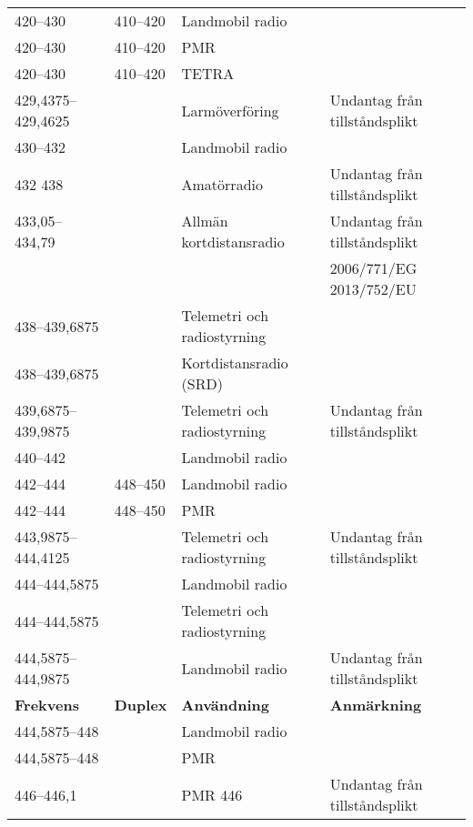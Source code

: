 \documentclass[10pt,swedish,a4paper,twoside]{article}
\begin{document}
\begin{landscape}
\begin{longtable}{llll}
	420--430           & 410--420           & Landmobil radio                &  \\
	420--430           & 410--420           & PMR                            &  \\
	420--430           & 410--420           & TETRA                          &  \\
	429,4375--429,4625 &                    & Larmöverföring                 & Undantag från tillståndsplikt       \\
	430--432           &                    & Landmobil radio                &  \\
	432	438            &                    & Amatörradio                    & Undantag från tillståndsplikt       \\
	433,05--434,79     &                    & Allmän kortdistansradio        & Undantag från tillståndsplikt       \\
	                   &                    &                                & 2006/771/EG 2013/752/EU             \\
	438--439,6875      &                    & Telemetri och radiostyrning    &  \\
	438--439,6875      &                    & Kortdistansradio (SRD)         &  \\
	439,6875--439,9875 &                    & Telemetri och radiostyrning    & Undantag från tillståndsplikt       \\
	440--442           &                    & Landmobil radio                &  \\
	442--444           & 448--450           & Landmobil radio                &  \\
	442--444           & 448--450           & PMR                            &  \\
	443,9875--444,4125 &                    & Telemetri och radiostyrning    & Undantag från tillståndsplikt       \\
444--444,5875      &                    & Landmobil radio                &  \\
	444--444,5875      &                    & Telemetri och radiostyrning    &  \\
	444,5875--444,9875 &                    & Landmobil radio                & Undantag från tillståndsplikt       \\
	\textbf{Frekvens}  & \textbf{Duplex}    & \textbf{Användning}            & \textbf{Anmärkning}                 \\ \hline
	444,5875--448      &                    & Landmobil radio                &  \\
	444,5875--448      &                    & PMR                            &  \\
	446--446,1         &                    & PMR 446                        & Undantag från tillståndsplikt       \\


\end{longtable}
\end{landscape}
\end{document}
